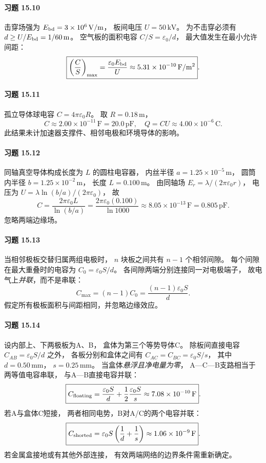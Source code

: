 \paragraph{习题 15.10}
击穿场强为
\(E_{\rm bd}=3\times10^6\,\mathrm{V/m}\)，
板间电压 \(U=50\,\mathrm{kV}\)。
为不击穿必须有
\(d\ge U/E_{\rm bd}=1/60\,\mathrm m\)。
空气板的面积电容
\(C/S=\varepsilon_0/d\)，
最大值发生在最小允许间距：
\[
 \boxed{\left(\frac CS\right)_{\max}
 =\frac{\varepsilon_0 E_{\rm bd}}{U}
 \approx5.31\times10^{-10}\,\mathrm{F/m^2}}.
\]

\paragraph{习题 15.11}
孤立导体球电容 \(C=4\pi\varepsilon_0R\)。
取 \(R=0.18\,\mathrm m\)，
\[
 \boxed{C\approx2.00\times10^{-11}\,\mathrm F
 =20.0\,\mathrm{pF}},
\quad
 \boxed{Q=CU
 \approx4.00\times10^{-6}\,\mathrm C}.
\]
此结果未计加速器支撑件、相邻电极和环境导体的影响。

\paragraph{习题 15.12}
同轴真空导体构成长度为 \(L\) 的圆柱电容器，
内丝半径
\(a=1.25\times10^{-5}\,\mathrm m\)，
圆筒内半径
\(b=1.25\times10^{-2}\,\mathrm m\)，
长度 \(L=0.100\,\mathrm m\)。
由同轴场
\(E_r=\lambda/(2\pi\varepsilon_0r)\)，
电压为
\(U=\lambda\ln(b/a)/(2\pi\varepsilon_0)\)，
故
\[
 \boxed{C=\frac{2\pi\varepsilon_0 L}{\ln(b/a)}
 =\frac{2\pi\varepsilon_0(0.100)}{\ln1000}
 \approx8.05\times10^{-13}\,\mathrm F
 =0.805\,\mathrm{pF}}.
\]
忽略两端边缘场。

\paragraph{习题 15.13}
当相邻极板交替归属两组电极时，
\(n\) 块板之间共有 \(n-1\) 个相邻间隙。
每个间隙在最大重叠时的电容为
\(C_0=\varepsilon_0S/d\)。
各间隙两端分别连接同一对电极端子，
故电气上\emph{并联}，而不是串联：
\[
 \boxed{C_{\max}=(n-1)C_0
 =\frac{(n-1)\varepsilon_0S}{d}}.
\]
假定所有极板面积与间距相同，并忽略边缘效应。

\paragraph{习题 15.14}
设内部上、下两极板为A、B，
盒体为第三个等势导体C。
除板间直接电容
\(C_{AB}=\varepsilon_0S/d\) 之外，
各板分别和盒体之间有
\(C_{AC}=C_{BC}=\varepsilon_0S/s\)，
其中
\(d=0.50\,\mathrm{mm}\)，
\(s=0.25\,\mathrm{mm}\)。
当盒体\emph{悬浮且净电量为零}，
A—C—B支路相当于两等值电容串联，
与A—B直接电容并联：
\[
 \boxed{C_{\rm floating}
 =\frac{\varepsilon_0S}{d}
 +\frac12\frac{\varepsilon_0S}{s}
 \approx7.08\times10^{-10}\,\mathrm F}.
\]
若A与盒体C短接，
两者相同电势，B对A/C的两个电容并联：
\[
 \boxed{C_{\rm shorted}
 =\varepsilon_0S\left(\frac1d+\frac1s\right)
 \approx1.06\times10^{-9}\,\mathrm F}.
\]
若金属盒接地或有其他外部连接，
有效两端网络的边界条件需重新确定。

